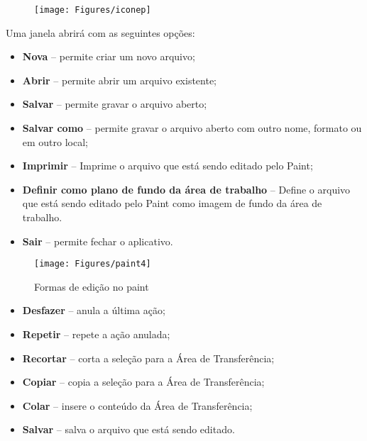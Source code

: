 \documentclass[12pt]{article}
\begin{document}
			\begin{figure}[!h]
				\centering
				\texttt{[image: Figures/iconep]}
				\label{fig:paintp}
			\end{figure}
			
			Uma janela abrirá com as seguintes opções:
			
			\begin{itemize}
				\item {\bf Nova} – permite criar um novo arquivo;
				
				\item {\bf Abrir} – permite abrir um arquivo existente;
				
				\item {\bf Salvar} – permite gravar o arquivo aberto;
				
				\item {\bf Salvar como} – permite gravar o arquivo aberto com outro nome, formato ou em outro local;
				
				\item {\bf Imprimir} – Imprime o arquivo que está sendo editado pelo Paint;
				
				\item {\bf Definir como plano de fundo da área de trabalho} – Define o arquivo que está sendo editado pelo Paint como imagem de fundo da área de trabalho.
				
				\item {\bf Sair} – permite fechar o aplicativo.
			\end{itemize}
			\bigskip
			\begin{figure}[!h]
				\centering
				\texttt{[image: Figures/paint4]}
				\label{fig:paint4}
				\caption{Formas de edição no paint}
			\end{figure}
			
			\begin{itemize}
				\item {\bf Desfazer} – anula a última ação;
				
				\item {\bf Repetir} – repete a ação anulada;
				
				\item {\bf Recortar} – corta a seleção para a Área de Transferência;
				
				\item {\bf Copiar} – copia a seleção para a Área de Transferência;
				
				\item {\bf Colar} – insere o conteúdo da Área de Transferência;
				
				\item {\bf Salvar} – salva o arquivo que está sendo editado.
			\end{itemize}
			
\end{document}

